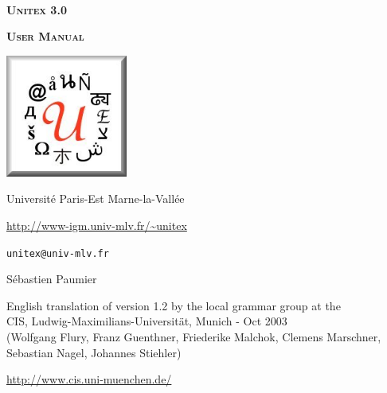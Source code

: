 
\begin{titlepage}
\begin{center}

~

\vspace{3cm}
\Huge
\textsc{\textbf{Unitex 3.0}}

\vspace{1cm}

\huge
\textsc{\textbf{User Manual}}

\vspace{2cm}

  \begin{center}
    \includegraphics[width=4cm]{resources/img/logo-Unitex.png}
  \end{center}
\normalsize

\vspace{2cm}

\LARGE

Universit\'e Paris-Est Marne-la-Vall\'ee
\bigskip
\normalsize

\url{http://www-igm.univ-mlv.fr/~unitex}

\verb$unitex@univ-mlv.fr$

\vspace{1cm}

S\'ebastien Paumier
\bigskip

English translation of version 1.2 by the local grammar group at the\\
 CIS, Ludwig-Maximilians-Universit\"at, Munich - Oct 2003\\
 (Wolfgang Flury, Franz Guenthner, Friederike Malchok, Clemens Marschner, 
 Sebastian Nagel, Johannes Stiehler)

\url{http://www.cis.uni-muenchen.de/}
\end{center}

\end{titlepage}
